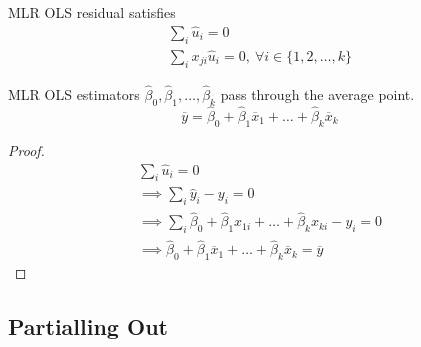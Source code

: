 \documentclass[]{article}
\begin{document}
    \begin{proposition}
        MLR OLS residual satisfies
        \begin{gather*}
            \sum_i {\hat{u}_i} = 0\\
            \sum_i {x_{ji} \hat{u}_i} = 0,\ \forall i \in \{1, 2, \dots, k\}
        \end{gather*}
    \end{proposition}
    
    \begin{proposition}
        MLR OLS estimators $\hat{\beta}_0, \hat{\beta}_1, \dots, \hat{\beta}_k$ pass through the average point.
        \[
            \overline{y} = \hat{\beta}_0 + \hat{\beta}_1 \overline{x}_1 + \dots + \hat{\beta}_k \overline{x}_k
        \]
    \end{proposition}
    \begin{proof}
    	\begin{gather*}
    		\sum_i {\hat{u}_i} = 0 \\
    		\implies \sum_i {\hat{y}_i - y_i} = 0 \\
    		\implies \sum_i {\hat{\beta}_0 + \hat{\beta}_1 x_{1i} + \dots + \hat{\beta}_k x_{ki} - y_i} = 0 \\
    		\implies \hat{\beta}_0 + \hat{\beta}_1 \overline{x}_1 + \dots + \hat{\beta}_k \overline{x}_k = \overline{y}
    	\end{gather*}
    \end{proof}
    
    \subsection{Partialling Out}
\end{document}
